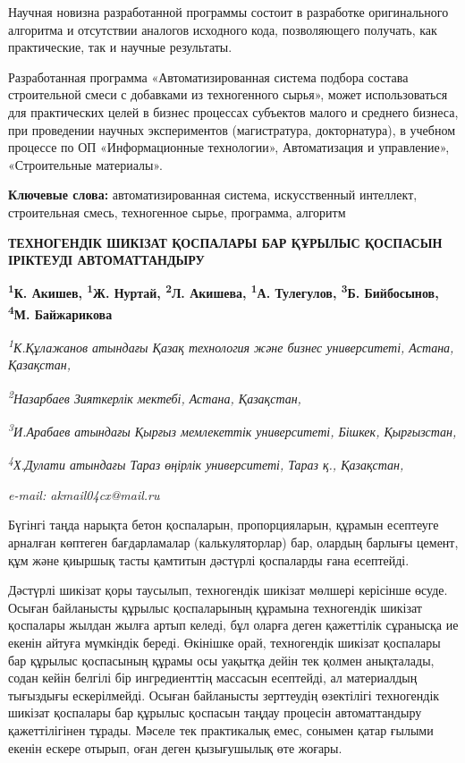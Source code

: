 Научная новизна разработанной программы состоит в разработке
оригинального алгоритма и отсутствии аналогов исходного кода,
позволяющего получать, как практические, так и научные результаты.

Разработанная программа «Автоматизированная система подбора состава
строительной смеси с добавками из техногенного сырья», может
использоваться для практических целей в бизнес процессах субъектов
малого и среднего бизнеса, при проведении научных экспериментов
(магистратура, докторнатура), в учебном процессе по ОП «Информационные
технологии», Автоматизация и управление», «Строительные материалы».

{\bfseries Ключевые слова:} автоматизированная система, искусственный
интеллект, строительная смесь, техногенное сырье, программа, алгоритм

\begin{articleheader}
{\bfseries ТЕХНОГЕНДІК ШИКІЗАТ ҚОСПАЛАРЫ БАР ҚҰРЫЛЫС ҚОСПАСЫН ІРІКТЕУДІ АВТОМАТТАНДЫРУ}

{\bfseries
\textsuperscript{1}К. Акишев\textsuperscript{\envelope },
\textsuperscript{1}Ж. Нуртай,
\textsuperscript{2}Л. Акишева,
\textsuperscript{1}А. Тулегулов,
\textsuperscript{3}Б. Бийбосынов,
\textsuperscript{4}М. Байжарикова}
\end{articleheader}

\begin{affiliation}
\emph{\textsuperscript{1}К.Құлажанов атындағы Қазақ технология және бизнес университеті, Астана, Қазақстан,}

\emph{\textsuperscript{2}Назарбаев Зияткерлік мектебі, Астана, Қазақстан,}

\emph{\textsuperscript{3}И.Арабаев атындағы Қырғыз мемлекеттік университеті, Бішкек, Қырғызстан,}

\emph{\textsuperscript{4}Х.Дулати атындағы Тараз өңірлік университеті, Тараз қ., Қазақстан,}

\emph{e-mail: akmail04cx@mail.ru}
\end{affiliation}

Бүгінгі таңда нарықта бетон қоспаларын, пропорцияларын, құрамын
есептеуге арналған көптеген бағдарламалар (калькуляторлар) бар, олардың
барлығы цемент, құм және қиыршық тасты қамтитын дәстүрлі қоспаларды ғана
есептейді.

Дәстүрлі шикізат қоры таусылып, техногендік шикізат мөлшері керісінше
өсуде. Осыған байланысты құрылыс қоспаларының құрамына техногендік
шикізат қоспалары жылдан жылға артып келеді, бұл оларға деген қажеттілік
сұранысқа ие екенін айтуға мүмкіндік береді. Өкінішке орай, техногендік
шикізат қоспалары бар құрылыс қоспасының құрамы осы уақытқа дейін тек
қолмен анықталады, содан кейін белгілі бір ингредиенттің массасын
есептейді, ал материалдың тығыздығы ескерілмейді. Осыған байланысты
зерттеудің өзектілігі техногендік шикізат қоспалары бар құрылыс қоспасын
таңдау процесін автоматтандыру қажеттілігінен тұрады. Мәселе тек
практикалық емес, сонымен қатар ғылыми екенін ескере отырып, оған деген
қызығушылық өте жоғары.

